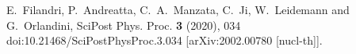 E.~Filandri, P.~Andreatta, C.~A.~Manzata, C.~Ji, W.~Leidemann and G.~Orlandini,
SciPost Phys. Proc. \textbf{3} (2020), 034
doi:10.21468/SciPostPhysProc.3.034
[arXiv:2002.00780 [nucl-th]].
